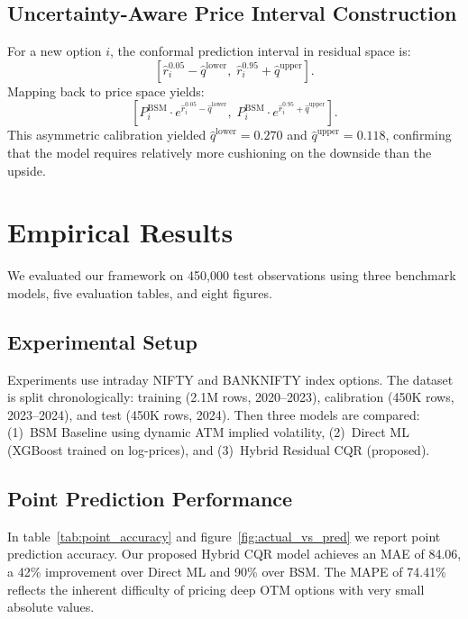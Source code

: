 \documentclass[runningheads]{llncs}
\newcommand{\rev}[1]{{\color{blue}#1}}
\begin{document}
\subsection{Uncertainty-Aware Price Interval Construction}

For a new option $i$, the conformal prediction interval in residual space is:
\begin{equation}
\left[ \hat{r}_i^{0.05} - \hat{q}^{\text{lower}}, \; \hat{r}_i^{0.95} + \hat{q}^{\text{upper}} \right].
\end{equation}
Mapping back to price space yields:
\begin{equation}
\left[ P^{\text{BSM}}_i \cdot e^{\hat{r}_i^{0.05} - \hat{q}^{\text{lower}}}, \; P^{\text{BSM}}_i \cdot e^{\hat{r}_i^{0.95} + \hat{q}^{\text{upper}}} \right].
\end{equation}
\rev{This asymmetric calibration yielded $\hat{q}^{\text{lower}} = 0.270$ and $\hat{q}^{\text{upper}} = 0.118$, confirming that the model requires relatively more cushioning on the downside than the upside.}


\section{Empirical Results}

\rev{We evaluated our framework on 450,000 test observations using three benchmark models, five evaluation tables, and eight figures.}

\subsection{Experimental Setup}

Experiments use intraday NIFTY and BANKNIFTY index options. The dataset is split chronologically: training (2.1M rows, 2020--2023), calibration (450K rows, 2023--2024), and test (450K rows, 2024). \rev{Then three models are compared: (1)~BSM Baseline using dynamic ATM implied volatility, (2)~Direct ML (XGBoost trained on log-prices), and (3)~Hybrid Residual CQR (proposed).}

\subsection{Point Prediction Performance}

\rev{In table~\ref{tab:point_accuracy} and {figure~\ref{fig:actual_vs_pred}} we report point prediction accuracy. Our proposed Hybrid CQR model achieves an MAE of 84.06, a 42\% improvement over Direct ML and 90\% over BSM. The MAPE of 74.41\% reflects the inherent difficulty of pricing deep OTM options with very small absolute values.}
\end{document}
